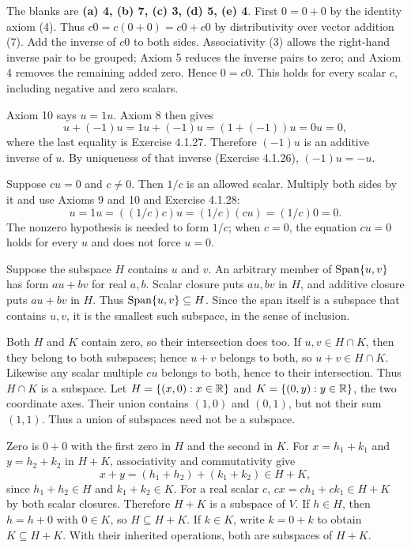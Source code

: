 The blanks are \textbf{(a) 4, (b) 7, (c) 3, (d) 5, (e) 4}.
First $0=0+0$ by the identity axiom (4). Thus
$c0=c(0+0)=c0+c0$ by distributivity over vector addition (7).
Add the inverse of $c0$ to both sides. Associativity (3) allows the
right-hand inverse pair to be grouped; Axiom 5 reduces the inverse pairs
to zero; and Axiom 4 removes the remaining added zero. Hence $0=c0$.
This holds for every scalar $c$, including negative and zero scalars.

Axiom 10 says $u=1u$. Axiom 8 then gives
\[
 u+(-1)u=1u+(-1)u=(1+(-1))u=0u=0,
\]
where the last equality is Exercise 4.1.27. Therefore $(-1)u$ is an additive
inverse of $u$. By uniqueness of that inverse (Exercise 4.1.26),
$(-1)u=-u$.

Suppose $cu=0$ and $c\ne0$. Then $1/c$ is an allowed scalar. Multiply
both sides by it and use Axioms 9 and 10 and Exercise 4.1.28:
\[
 u=1u=((1/c)c)u=(1/c)(cu)=(1/c)0=0.
\]
The nonzero hypothesis is needed to form $1/c$; when $c=0$, the equation
$cu=0$ holds for every $u$ and does not force $u=0$.

Suppose the subspace $H$ contains $u$ and $v$. An arbitrary member of
$\operatorname{Span}\{u,v\}$ has form $au+bv$ for real $a,b$.
Scalar closure puts $au,bv$ in $H$, and additive closure puts $au+bv$ in $H$.
Thus $\operatorname{Span}\{u,v\}\subseteq H$. Since the span itself is a subspace that
contains $u,v$, it is the smallest such subspace, in the sense of inclusion.

Both $H$ and $K$ contain zero, so their intersection does too.
If $u,v\in H\cap K$, then they belong to both subspaces; hence $u+v$
belongs to both, so $u+v\in H\cap K$. Likewise any scalar multiple $cu$
belongs to both, hence to their intersection. Thus $H\cap K$ is a subspace.
Let $H=\{(x,0):x\in\mathbb{R}\}$ and $K=\{(0,y):y\in\mathbb{R}\}$, the two coordinate
axes. Their union contains $(1,0)$ and $(0,1)$, but not their sum $(1,1)$.
Thus a union of subspaces need not be a subspace.

Zero is $0+0$ with the first zero in $H$ and the second in $K$.
For $x=h_1+k_1$ and $y=h_2+k_2$ in $H+K$, associativity and commutativity give
\[
 x+y=(h_1+h_2)+(k_1+k_2)\in H+K,
\]
since $h_1+h_2\in H$ and $k_1+k_2\in K$.
For a real scalar $c$, $cx=ch_1+ck_1\in H+K$ by both scalar closures.
Therefore $H+K$ is a subspace of $V$.
If $h\in H$, then $h=h+0$ with $0\in K$, so $H\subseteq H+K$.
If $k\in K$, write $k=0+k$ to obtain $K\subseteq H+K$.
With their inherited operations, both are subspaces of $H+K$.

